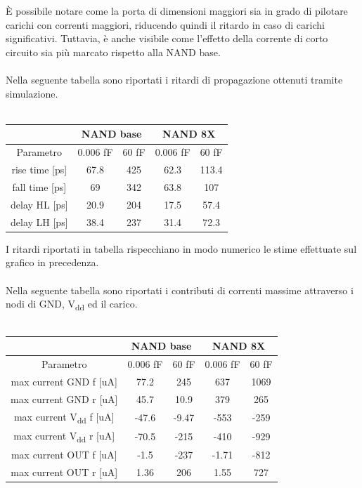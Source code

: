 \documentclass[11pt,  english, makeidx, a4paper, titlepage, oneside]{book}
\begin{document}
\\\\
È possibile notare come la porta di dimensioni maggiori sia in grado di pilotare carichi con correnti maggiori, riducendo quindi il ritardo in caso di carichi significativi. Tuttavia, è anche visibile come l'effetto della corrente di corto circuito sia più marcato rispetto alla NAND base.
\\\\
Nella seguente tabella sono riportati i ritardi di propagazione ottenuti tramite simulazione.
\\\\
\begin{center}
	\begin{tabular}{|c|c|c||c|c|}
	\hline
	& \multicolumn{2}{c}{NAND base} & \multicolumn{2}{c}{NAND 8X}\\
	\hline
	Parametro & 0.006 fF & 60 fF & 0.006 fF & 60 fF \\
	\hline
	rise time [ps] & 67.8 & 425 & 62.3 & 113.4\\
	\hline
	 fall time [ps] & 69 & 342 & 63.8 & 107 \\
	\hline
	delay HL [ps] & 20.9 & 204 & 17.5 & 57.4  \\
	\hline
	delay LH [ps] & 38.4 & 237 & 31.4 & 72.3 \\
	\hline
	\end{tabular}	
\end{center}
\vspace{0.3cm}
I ritardi riportati in tabella rispecchiano in modo numerico le stime effettuate sul grafico in precedenza.
\\\\
Nella seguente tabella sono riportati i contributi di correnti massime attraverso i nodi di GND, V\textsubscript{dd} ed il carico.
\\\\
\begin{center}
	\begin{tabular}{|c|c|c||c|c|}
	\hline
	& \multicolumn{2}{c}{NAND base} & \multicolumn{2}{c}{NAND 8X}\\
	\hline
	Parametro & 0.006 fF & 60 fF & 0.006 fF & 60 fF \\
	\hline
	max current GND f [uA] & 77.2 & 245 & 637 & 1069 \\
	\hline
	max current GND r [uA] & 45.7 & 10.9 & 379 & 265 \\
	\hline
	max current V\textsubscript{dd} f [uA] & -47.6 & -9.47 & -553 & -259 \\
	\hline
	max current V\textsubscript{dd} r [uA] & -70.5 & -215 & -410 & -929  \\
	\hline
	max current OUT f [uA] & -1.5 & -237 & -1.71 & -812 \\
	\hline
	max current OUT r [uA] & 1.36 & 206 & 1.55 & 727 \\
	\hline
	\end{tabular}	
\end{center}
\end{document}
